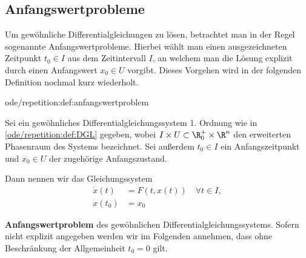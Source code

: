 \documentclass[letterpaper,10pt,german]{jupyterBook}
\begin{document}
\subsection{Anfangswertprobleme}
\label{\detokenize{ode/repetition:anfangswertprobleme}}
\par
Um gewöhnliche Differentialgleichungen zu lösen, betrachtet man in der Regel sogenannte Anfangswertprobleme.
Hierbei wählt man einen ausgezeichneten Zeitpunkt \(t_0\in I\) aus dem Zeitintervall \(I\), an welchem man die Lösung explizit durch einen Anfangswert \(x_0\in U\) vorgibt.
Dieses Vorgehen wird in der folgenden Definition nochmal kurz wiederholt.
\begin{definition}{}{ode/repetition:def:anfangswertproblem}



\par
Sei ein gewöhnliches Differentialgleichungssystem 1. Ordnung wie in \cref{ode/repetition:def:DGL} gegeben, wobei \(I \times U \subset \R_0^+ \times \R^n\) den erweiterten Phasenraum des Systems bezeichnet.
Sei außerdem \(t_0 \in I\) ein Anfangszeitpunkt und \(x_0 \in U\) der zugehörige Anfangszustand.

\par
Dann nennen wir das Gleichungssystem
\begin{align}\label{equation:ode/repetition:eq:AWP}
\dot{x}(t) &= F(t, x(t))\quad\forall t\in I, \\
x(t_0) &= x_0
\end{align}
\par
\textbf{Anfangswertproblem} des gewöhnlichen Differentialgleichungssystems.
Sofern nicht explizit angegeben werden wir im Folgenden annehmen, dass ohne Beschränkung der Allgemeinheit \(t_0=0\) gilt.
\end{definition}
\end{document}
